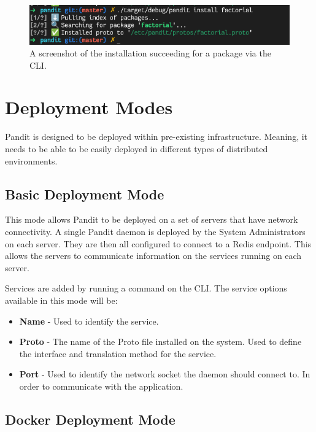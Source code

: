 \documentclass[a4paper,12pt]{report}
\begin{document}
\begin{itemize}
    \begin{figure}[hbt!]
        \centering
        \includegraphics[width=\linewidth]{cli3.png}
        \caption{A screenshot of the installation succeeding for a package via the CLI.}
        \label{fig:admin}
    \end{figure}
    \newpage

\end{itemize}

\section{Deployment Modes}
\label{sec:deployment_modes}
Pandit is designed to be deployed within pre-existing infrastructure. Meaning, it needs to be able to be easily deployed in different types of 
distributed environments.


\subsection{Basic Deployment Mode}
This mode allows Pandit to be deployed on a set of servers that have network connectivity. A single Pandit daemon is deployed by the System Administrators on each server. They are then all configured to connect to a Redis endpoint. This allows the servers to communicate information on the services running on each server.

Services are added by running a command on the CLI. The service options available in this mode will be:

\begin{itemize}
    \item \textbf{Name} - Used to identify the service.
    \item \textbf{Proto} - The name of the Proto file installed on the system. Used to define the interface and translation method for the service.
    \item \textbf{Port} - Used to identify the network socket the daemon should connect to. In order to communicate with the application.
\end{itemize}

\subsection{Docker Deployment Mode}
\end{document}

